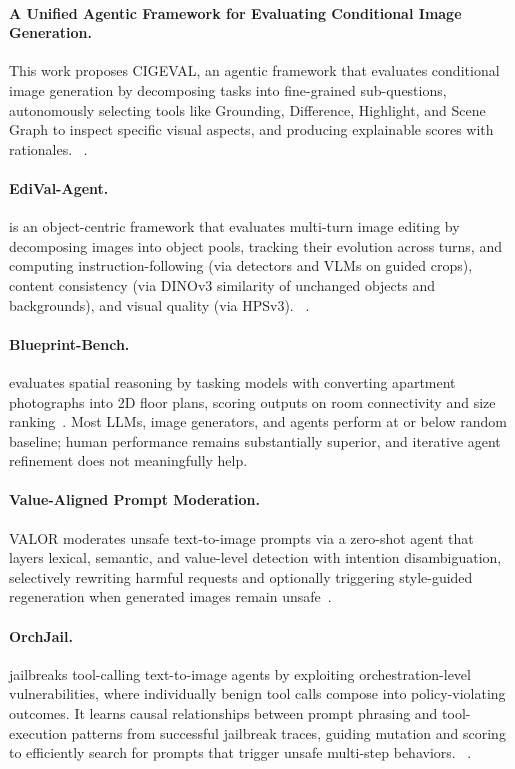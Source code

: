 \paragraph{A Unified Agentic Framework for Evaluating Conditional Image Generation.}
This work proposes CIGEVAL, an agentic framework that evaluates conditional image generation by decomposing tasks into fine-grained sub-questions, autonomously selecting tools like Grounding, Difference, Highlight, and Scene Graph to inspect specific visual aspects, and producing explainable scores with rationales. ~\cite{avg250407046}.

\paragraph{EdiVal-Agent.}
is an object-centric framework that evaluates multi-turn image editing by decomposing images into object pools, tracking their evolution across turns, and computing instruction-following (via detectors and VLMs on guided crops), content consistency (via DINOv3 similarity of unchanged objects and backgrounds), and visual quality (via HPSv3). ~\cite{avg250913399}.

\paragraph{Blueprint-Bench.}
 evaluates spatial reasoning by tasking models with converting apartment photographs into 2D floor plans, scoring outputs on room connectivity and size ranking~\cite{avg250925229}. Most LLMs, image generators, and agents perform at or below random baseline; human performance remains substantially superior, and iterative agent refinement does not meaningfully help.

\paragraph{Value-Aligned Prompt Moderation.}
VALOR moderates unsafe text-to-image prompts via a zero-shot agent that layers lexical, semantic, and value-level detection with intention disambiguation, selectively rewriting harmful requests and optionally triggering style-guided regeneration when generated images remain unsafe~\cite{avg251111693}. 

\paragraph{OrchJail.}
 jailbreaks tool-calling text-to-image agents by exploiting orchestration-level vulnerabilities, where individually benign tool calls compose into policy-violating outcomes. It learns causal relationships between prompt phrasing and tool-execution patterns from successful jailbreak traces, guiding mutation and scoring to efficiently search for prompts that trigger unsafe multi-step behaviors. ~\cite{avg260507414}.

